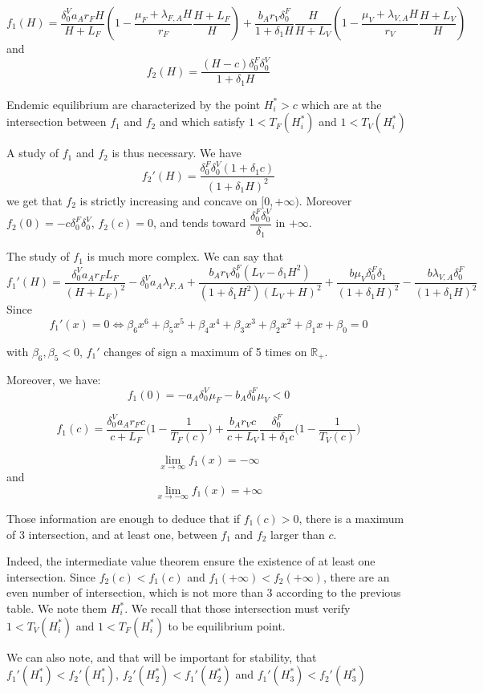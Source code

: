 \documentclass{article}
\newcommand{\lfa}{\lambda_{F, A}}
\newcommand{\lva}{\lambda_{V, A}}
\newcommand{\df}{\delta_0^F}
\newcommand{\dv}{\delta_0^V}
\begin{document}
$$
f_1(H) = \dfrac{\dv a_A r_F H}{H + L_F}\left(1 - \dfrac{\mu_F + \lfa H}{r_F}\dfrac{H + L_F}{H}\right) + \dfrac{ b_A r_V \df}{1+ \delta_1 H} \dfrac{H}{H + L_V}\left(1  - \dfrac{\mu_V + \lva H}{r_V}\dfrac{H + L_V}{H} \right)
$$
and
$$
f_2(H) = \dfrac{(H- c) \df \dv}{1 + \delta_1 H}
$$

Endemic equilibrium are characterized by the point $H^*_i > c$ which are at the intersection between $f_1$ and $f_2$ and which satisfy $1< T_F(H^*_i)$ and $1 < T_V(H^*_i)$

A study of $f_1$ and $f_2$ is thus necessary. We have
$$
f_2'(H) = \dfrac{\df \dv(1 + \delta_1 c)}{(1 + \delta_1 H)^2}
$$
we get that $f_2$ is strictly increasing and concave on $[0, +\infty)$. Moreover $f_2(0) = - c \df \dv$, $f_2(c) = 0$, and tends toward $\dfrac{\df \dv}{\delta_1}$ in $+ \infty$.



The study of $f_1$ is much more complex. We can say that
$$
f_1'(H) = \dfrac{\dv a_A r_F L_F}{(H + L_F)^2} - \dv a_A \lfa + \dfrac{b_A r_V \df(L_V - \delta_1 H^2)}{(1+\delta_1 H^2)(L_V + H)^2} + \dfrac{b\mu_V \df \delta_1}{(1+\delta_1H)^2} - \dfrac{b \lva \df }{(1+\delta_1 H)^2}
$$
Since
$$
f_1'(x) = 0 \Leftrightarrow \beta_6 x^6 +\beta_5 x^5+\beta_4 x^4+\beta_3 x^3+\beta_2 x^2+\beta_1 x+\beta_0 = 0
$$

with $\beta_6, \beta_5 < 0$, $f_1'$ changes of sign a maximum of 5 times on $\mathbb{R}_+$.

Moreover, we have:
$$f_1(0) = -a_A \dv \mu_F - b_A\df \mu_V < 0$$

$$
f_1(c) = \dfrac{\dv a_A r_F c}{c + L_F} \Big(1 - \dfrac{1}{T_F(c)} \Big) + \dfrac{b_A r_V c}{c + L_V}\dfrac{\df }{1 + \delta_1 c} \Big(1 - \dfrac{1}{T_V(c)} \Big)
$$

$$\lim_{x\to\infty} f_1(x) = - \infty $$
and 
$$\lim_{x\to-\infty} f_1(x) = + \infty $$


Those information are enough to deduce that if $f_1(c) > 0$, there is a maximum of 3 intersection, and at least one, between $f_1$ and $f_2$ larger than $c$.

Indeed, the intermediate value theorem ensure the existence of at least one intersection. Since $f_2(c) < f_1(c)$ and $f_1(+\infty) < f_2(+\infty)$, there are an even number of intersection, which is not more than $3$ according to the previous table. We note them $H^*_i$. We recall that those intersection must verify $1 < T_V(H^*_i)$ and $1<T_F(H_i^*)$ to be equilibrium point.

We can also note, and that will be important for stability, that $f_1'(H_1^*) < f_2'(H_1^*)$, $f_2'(H_2^*) < f_1'(H_2^*)$ and $f_1'(H_3^*) < f_2'(H_3^*)$
\end{document}
